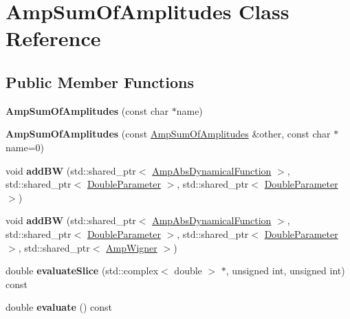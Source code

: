 \hypertarget{class_amp_sum_of_amplitudes}{\section{Amp\-Sum\-Of\-Amplitudes Class Reference}
\label{class_amp_sum_of_amplitudes}
}
\subsection*{Public Member Functions}
\begin{DoxyCompactItemize}
\item 
\hypertarget{class_amp_sum_of_amplitudes_a978ca211858e8caa2d76817493dd4d65}{{\bfseries Amp\-Sum\-Of\-Amplitudes} (const char $\ast$name)}\label{class_amp_sum_of_amplitudes_a978ca211858e8caa2d76817493dd4d65}

\item 
\hypertarget{class_amp_sum_of_amplitudes_a0ae9ae3c2d26ba0e2f0dea9ed3848ad3}{{\bfseries Amp\-Sum\-Of\-Amplitudes} (const \hyperlink{class_amp_sum_of_amplitudes}{Amp\-Sum\-Of\-Amplitudes} \&other, const char $\ast$name=0)}\label{class_amp_sum_of_amplitudes_a0ae9ae3c2d26ba0e2f0dea9ed3848ad3}

\item 
\hypertarget{class_amp_sum_of_amplitudes_abd10da2566cce5a11e57812fdf678554}{void {\bfseries add\-B\-W} (std\-::shared\-\_\-ptr$<$ \hyperlink{class_amp_abs_dynamical_function}{Amp\-Abs\-Dynamical\-Function} $>$, std\-::shared\-\_\-ptr$<$ \hyperlink{class_double_parameter}{Double\-Parameter} $>$, std\-::shared\-\_\-ptr$<$ \hyperlink{class_double_parameter}{Double\-Parameter} $>$)}\label{class_amp_sum_of_amplitudes_abd10da2566cce5a11e57812fdf678554}

\item 
\hypertarget{class_amp_sum_of_amplitudes_a1500e62dc5c3fe7d4423238705e0b19f}{void {\bfseries add\-B\-W} (std\-::shared\-\_\-ptr$<$ \hyperlink{class_amp_abs_dynamical_function}{Amp\-Abs\-Dynamical\-Function} $>$, std\-::shared\-\_\-ptr$<$ \hyperlink{class_double_parameter}{Double\-Parameter} $>$, std\-::shared\-\_\-ptr$<$ \hyperlink{class_double_parameter}{Double\-Parameter} $>$, std\-::shared\-\_\-ptr$<$ \hyperlink{class_amp_wigner}{Amp\-Wigner} $>$)}\label{class_amp_sum_of_amplitudes_a1500e62dc5c3fe7d4423238705e0b19f}

\item 
\hypertarget{class_amp_sum_of_amplitudes_ac60d21d59ef7427c1dcdf300e6f59f0b}{double {\bfseries evaluate\-Slice} (std\-::complex$<$ double $>$ $\ast$, unsigned int, unsigned int) const }\label{class_amp_sum_of_amplitudes_ac60d21d59ef7427c1dcdf300e6f59f0b}

\item 
\hypertarget{class_amp_sum_of_amplitudes_abc905466c8533801103d3ae5e69d4c34}{double {\bfseries evaluate} () const }\label{class_amp_sum_of_amplitudes_abc905466c8533801103d3ae5e69d4c34}

\end{DoxyCompactItemize}
